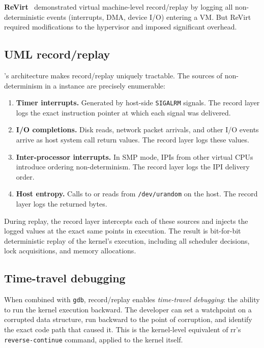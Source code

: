 \textbf{ReVirt}~\cite{dunlap2002} demonstrated virtual machine-level
record/replay by logging all non-deterministic events (interrupts,
DMA, device I/O) entering a VM.  But ReVirt required modifications
to the hypervisor and imposed significant overhead.

\subsection{UML record/replay}

\UML{}'s architecture makes record/replay uniquely tractable.  The
sources of non-determinism in a \UML{} instance are precisely
enumerable:

\begin{enumerate}[leftmargin=2em]
  \item \textbf{Timer interrupts.}  Generated by host-side
        \texttt{SIGALRM} signals.  The record layer logs the exact
        instruction pointer at which each signal was delivered.
  \item \textbf{I/O completions.}  Disk reads, network packet arrivals,
        and other I/O events arrive as host system call return values.
        The record layer logs these values.
  \item \textbf{Inter-processor interrupts.}  In SMP mode, IPIs from
        other virtual CPUs introduce ordering non-determinism.  The
        record layer logs the IPI delivery order.
  \item \textbf{Host entropy.}  Calls to  or reads
        from \texttt{/dev/urandom} on the host.  The record layer logs
        the returned bytes.
\end{enumerate}

During replay, the record layer intercepts each of these sources and
injects the logged values at the exact same points in execution.  The
result is bit-for-bit deterministic replay of the kernel's execution,
including all scheduler decisions, lock acquisitions, and memory
allocations.

\subsection{Time-travel debugging}

When combined with \texttt{gdb}, record/replay enables \emph{time-travel
debugging}: the ability to run the kernel execution backward.  The
developer can set a watchpoint on a corrupted data structure, run
backward to the point of corruption, and identify the exact code path
that caused it.  This is the kernel-level equivalent of rr's
\texttt{reverse-continue} command, applied to the kernel itself.

